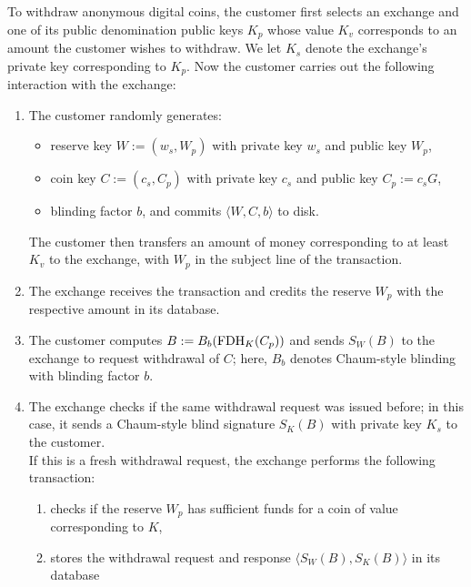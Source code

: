 \documentclass{llncs}
\begin{document}
To withdraw anonymous digital coins, the customer first selects an
exchange and one of its public denomination public keys $K_p$ whose
value $K_v$ corresponds to an amount the customer wishes to withdraw.
We let $K_s$ denote the exchange's private key corresponding to $K_p$.
Now the customer carries out the following interaction with the exchange:


\begin{enumerate}
  \item The customer randomly generates:
    \begin{itemize}
      \item reserve key $W := (w_s,W_p)$ with private key $w_s$ and public key $W_p$,
      \item coin key $C := (c_s,C_p)$ with private key $c_s$ and public key $C_p := c_s G$,
      \item blinding factor $b$, and commits $\langle W, C, b \rangle$ to disk.
    \end{itemize}
    The customer then transfers an amount of money corresponding to
    at least $K_v$ to the exchange, with $W_p$ in the subject line
    of the transaction.
  \item
    The exchange receives the transaction and credits the reserve $W_p$
    with the respective amount in its database.
  \item
    The customer computes $B := B_b(\textrm{FDH}_K(C_p))$ and sends $S_W(B)$ to
    the exchange to request withdrawal of $C$; here, $B_b$ denotes
    Chaum-style blinding with blinding factor $b$.
  \item
    The exchange checks if the same withdrawal request was issued before;
    in this case, it sends a Chaum-style blind signature $S_K(B)$ with
    private key $K_s$ to the customer. \\
    If this is a fresh withdrawal request, the exchange performs the following transaction:
    \begin{enumerate}
      \item checks if the reserve $W_p$ has sufficient funds
            for a coin of value corresponding to $K$,
      \item stores the withdrawal request and response
            $\langle S_W(B), S_K(B) \rangle$ in its database

\end{enumerate}
\end{enumerate}
\end{document}
